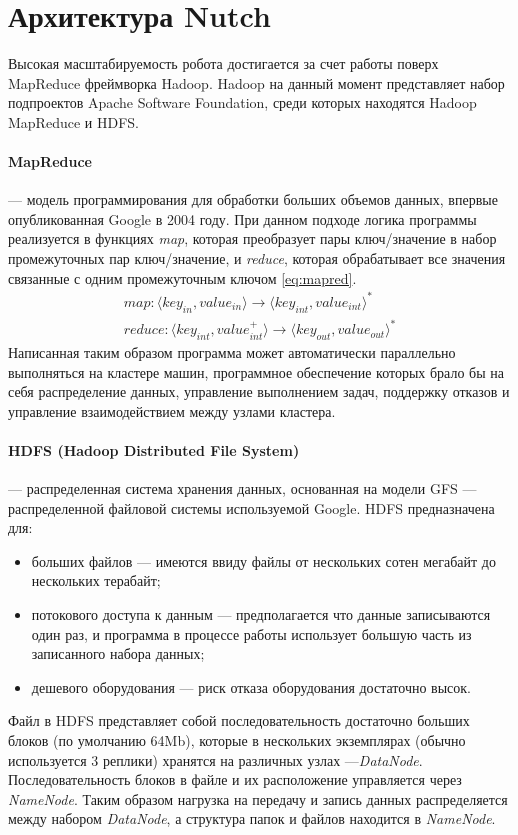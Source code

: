 \section{Архитектура Nutch}
Высокая масштабируемость робота достигается за счет работы поверх MapReduce фреймворка Hadoop\cite{hadoopdefguide}. Hadoop на данный момент представляет набор подпроектов Apache Software Foundation, среди которых находятся Hadoop MapReduce и HDFS. 
\paragraph{MapReduce} --- модель программирования для обработки больших объемов данных, впервые опубликованная\cite{googlemr} Google в 2004 году. При данном подходе логика программы реализуется в функциях \textit{map}, которая преобразует пары ключ/значение в набор промежуточных пар ключ/значение, и \textit{reduce}, которая обрабатывает все значения связанные с одним промежуточным ключом \ref{eq:mapred}.
\begin{equation}\label{eq:mapred}
\begin{split}
map:\langle key_{in}, value_{in}\rangle\rightarrow\langle key_{int}, value_{int}\rangle^{*} \\
reduce:\langle key_{int}, value_{int}^{+}\rangle\rightarrow\langle key_{out}, value_{out}\rangle^{*}
\end{split}
\end{equation}
Написанная таким образом программа может автоматически параллельно выполняться на кластере машин, программное обеспечение которых брало бы на себя распределение данных, управление выполнением задач, поддержку отказов и управление взаимодействием между узлами кластера. 
\paragraph{HDFS (Hadoop Distributed File System)} --- распределенная система хранения данных, основанная на модели GFS\cite{gfs} --- распределенной файловой системы используемой Google. HDFS предназначена для:
\begin{itemize}
 \item больших файлов --- имеются ввиду файлы от нескольких сотен мегабайт до нескольких терабайт;
 \item потокового доступа к данным --- предполагается что данные записываются один раз, и программа в процессе работы использует большую часть из записанного набора данных;
 \item дешевого оборудования --- риск отказа оборудования достаточно высок.
\end{itemize}
Файл в HDFS представляет собой последовательность достаточно больших блоков (по умолчанию 64Mb), которые в нескольких экземплярах (обычно используется 3 реплики) хранятся на различных узлах ---\textit{DataNode}. Последовательность блоков в файле и их расположение управляется через \textit{NameNode}. Таким образом нагрузка на передачу и запись данных распределяется между набором \textit{DataNode}, а структура папок и файлов находится в \textit{NameNode}.

